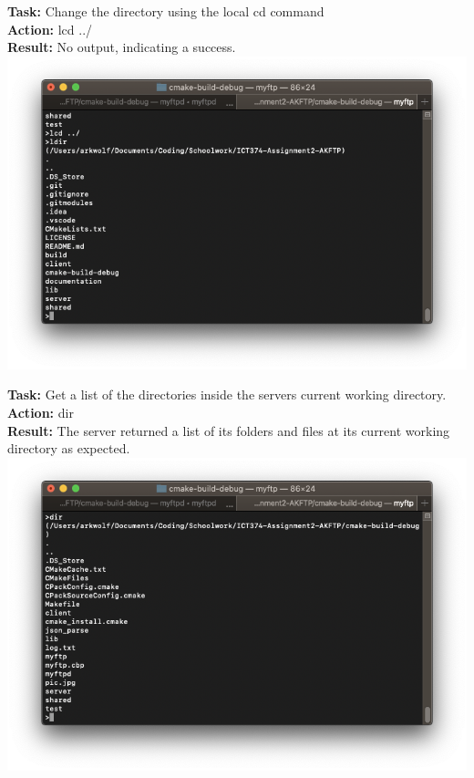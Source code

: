 \documentclass{article}
\begin{document}
\textbf{Task:} Change the directory using the local cd command\\
\textbf{Action:} lcd ../\\
\textbf{Result:} No output, indicating a success.\\
\includegraphics[width=\textwidth]{testpictures/lcd}

\textbf{Task:} Get a list of the directories inside the servers current working directory.\\
\textbf{Action:} dir\\
\textbf{Result:} The server returned a list of its folders and files at its current working directory as expected.\\
\includegraphics[width=\textwidth]{testpictures/dir}
\end{document}
